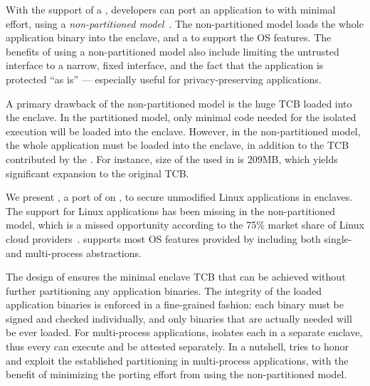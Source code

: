 {With the support of a \libos{}, developers can port an application to \sgx{} with minimal effort,
using a {\em non-partitioned model}~\citep{baumann14haven}.
The non-partitioned model loads the whole application binary into the enclave,
and a \libos{} to support the OS features.
The benefits of using a non-partitioned model also include
limiting the untrusted interface to a narrow, fixed interface,
and the fact that the application is protected ``as is''
--- especially useful for privacy-preserving applications.


A primary drawback of the non-partitioned model is the huge TCB loaded into the enclave.
In the partitioned model, only minimal code needed for the isolated execution will be loaded into the enclave.
However, in the non-partitioned model, the whole application must be loaded into the enclave,
in addition to the TCB contributed by the \libos{}.
For instance, size of the \libos{} used in \cite{baumann14haven} is 209MB,
which yields significant expansion to the original TCB.

We present {\em \gsgx{}}, a port of \graphene{} \libos{} on \sgx{}, to secure unmodified Linux applications in \sgx{} enclaves{}.
The support for Linux applications
has been missing in the non-partitioned model,
which is a missed opportunity according to the 75\% market share of Linux cloud providers~\citep{linuxcloud2014}.
\gsgx{} supports most OS features provided by \graphene{}
including both single- and multi-process abstractions.

The design of \gsgx{} ensures the minimal enclave TCB
that can be achieved without further partitioning any application binaries.
The integrity of the loaded application binaries
is enforced in a fine-grained fashion:
each binary must be signed and checked individually,
and only binaries that are actually needed will be ever loaded.
For multi-process applications,
\gsgx{} isolates each \picoproc{} in a separate enclave,
thus every \picoproc{} can execute and be attested separately.
In a nutshell, \gsgx{} tries to honor and exploit the established partitioning in multi-process applications,
with the benefit of minimizing the porting effort from using the non-partitioned model.



}
